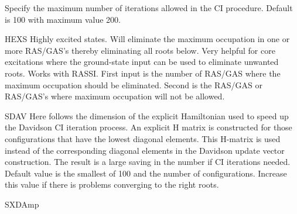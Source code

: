 \begin{keywordlist}
Specify the maximum number of iterations allowed in the CI
procedure. Default is 100 with maximum value 200.
\item[HEXS]
Highly excited states. Will eliminate the maximum occupation in
one or more RAS/GAS's thereby eliminating all roots below.
Very helpful for core excitations where the ground-state input
can be used to eliminate unwanted roots. Works with RASSI.
First input is the number of RAS/GAS where the maximum occupation
should be eliminated. Second is the RAS/GAS or RAS/GAS's where
maximum occupation will not be allowed.
\item[SDAV]
Here follows the dimension of the explicit Hamiltonian used to speed up
the Davidson CI iteration process. An explicit H matrix is constructed
for those configurations that have the lowest diagonal elements.
This H-{}matrix is used instead of the corresponding diagonal elements
in the Davidson update vector construction. The result is a large saving
in the number if CI iterations needed. Default value is the smallest of 100
and the number of configurations. Increase this value if there is problems
converging to the right roots.
\item[SXDAmp]

\end{keywordlist}
